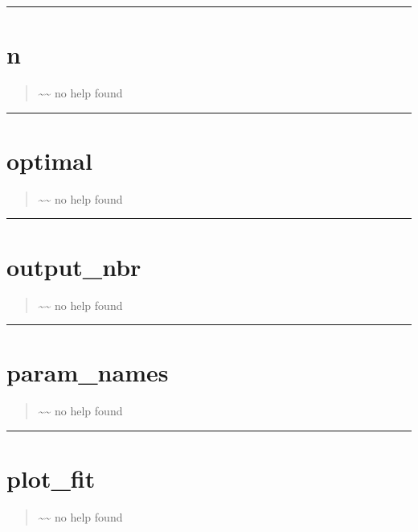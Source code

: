 \documentclass[letterpaper,10pt,english]{sphinxmanual}
\begin{document}
\bigskip\hrule{}\bigskip



\section{n}
\label{classes/utils/@hdmr/hdmr:id14}\label{classes/utils/@hdmr/hdmr:id15}\begin{quote}

\textasciitilde{}\textasciitilde{} no help found
\end{quote}


\bigskip\hrule{}\bigskip



\section{optimal}
\label{classes/utils/@hdmr/hdmr:optimal}\label{classes/utils/@hdmr/hdmr:id16}\begin{quote}

\textasciitilde{}\textasciitilde{} no help found
\end{quote}


\bigskip\hrule{}\bigskip



\section{output\_nbr}
\label{classes/utils/@hdmr/hdmr:output-nbr}\label{classes/utils/@hdmr/hdmr:id17}\begin{quote}

\textasciitilde{}\textasciitilde{} no help found
\end{quote}


\bigskip\hrule{}\bigskip



\section{param\_names}
\label{classes/utils/@hdmr/hdmr:id18}\label{classes/utils/@hdmr/hdmr:param-names}\begin{quote}

\textasciitilde{}\textasciitilde{} no help found
\end{quote}


\bigskip\hrule{}\bigskip



\section{plot\_fit}
\label{classes/utils/@hdmr/hdmr:id19}\label{classes/utils/@hdmr/hdmr:plot-fit}\begin{quote}

\textasciitilde{}\textasciitilde{} no help found
\end{quote}
\end{document}
